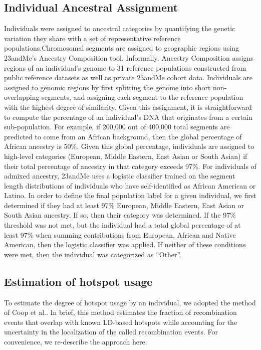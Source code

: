 \subsection{Individual Ancestral Assignment}
 
Individuals were assigned to ancestral categories by quantifying the
genetic variation they share with a set of representative reference
populations.Chromosomal segments are assigned to geographic regions using
23andMe's Ancestry Composition tool\cite{23andMe2014}.  Informally, Ancestry Composition assigns
regions of an individual's genome to 31 reference populations constructed from
public reference datasets as well as private 23andMe cohort data\cite{23andMe2012}.  
Individuals are assigned to genomic regions by first splitting the genome into short
non-overlapping segments, and assigning each segment to the reference
population with the highest degree of similarity. Given this assignment, it is
straightforward to compute the percentage of an individual's DNA that originates
from a certain sub-population.  For example, if 200,000 out of 400,000 total
segments are predicted to come from an African background, then the global
percentage of African ancestry is 50\%.  Given this global percentage,
individuals are assigned to high-level categories (European, Middle Eastern,
East Asian or South Asian) if their total percentage of ancestry in
that category exceeds 97\%. For individuals of admixed ancestry, 23andMe uses a
logistic classifier trained on the segment length distributions of individuals
who have self-identified as African American or Latino. In order to
define the final population label for a given individual, we first determined if
they had at least 97\% European, Middle Eastern, East Asian or South Asian
ancestry. If so, then their category was determined.  If the 97\% threshold
was not met, but the individual had a total global percentage of at least 97\%
when summing contributions from European, African and Native American, then
the logistic classifier was applied. If neither of these conditions were met,
then the individual was categorized as ``Other''.  
 
\subsection{Estimation of hotspot usage }
 
To estimate the degree of hotspot usage by an individual, we adopted the  
method of Coop et al.\cite{Coop2008}. In brief, this method estimates the fraction of recombination  
events that overlap with known LD-based hotspots while accounting for the  
uncertainty in the localization of the called recombination events. For convenience,  
we re-describe the approach here.  
 
